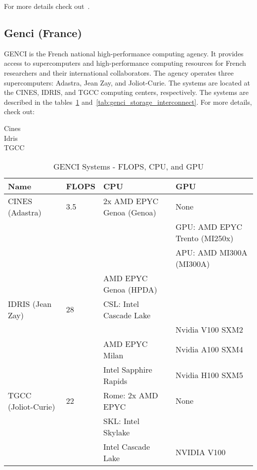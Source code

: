 For more details check out~\cite{eurohpc_supercomputers}.

\subsection*{Genci (France)}
\label{sec:arch:genci}

\ac{GENCI} is the French national high-performance computing agency. It provides access to supercomputers and high-performance computing resources for French researchers and their international collaborators. The agency operates three supercomputers: Adastra, Jean Zay, and Joliot-Curie. The systems are located at the CINES, IDRIS, and TGCC computing centers, respectively. The systems are described in the tables~\ref{tab:genci_flops_cpu_gpu} and~\ref{tab:genci_storage_interconnect}.
For more details, check out:
\begin{description}
    \item[Cines] 
    \item[Idris] 
    \item[TGCC]  
\end{description}


    \begin{table}[h!]
        \centering
        \begin{tabular}{l l l l}
        \toprule
        \textbf{Name} & \textbf{FLOPS} & \textbf{CPU} & \textbf{GPU} \\
        \midrule
        CINES (Adastra) & 3.5 & 2x AMD EPYC Genoa (Genoa) & None \\
        & & & GPU: AMD EPYC Trento (MI250x)  \\
        & & & APU: AMD MI300A (MI300A)  \\
        & & AMD EPYC Genoa (HPDA) & \\
        IDRIS (Jean Zay) & 28 & CSL: Intel Cascade Lake & \\
        & &                & Nvidia V100 SXM2 \\
        & & AMD EPYC Milan &  Nvidia A100 SXM4\\
        & & Intel Sapphire Rapids & Nvidia H100 SXM5        \\
        TGCC (Joliot-Curie) & 22 & Rome: 2x AMD EPYC  & None \\
        & & SKL:  Intel Skylake & \\
        & & Intel Cascade Lake & NVIDIA V100 \\
        \bottomrule
        \end{tabular}
        \caption{GENCI Systems - FLOPS, CPU, and GPU}
        \label{tab:genci_flops_cpu_gpu}
    \end{table}


